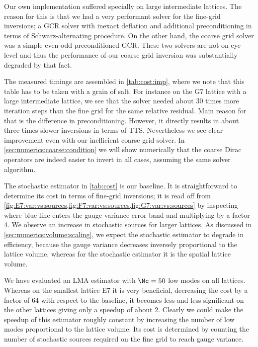 Our own implementation suffered specially on large intermediate lattices.
The reason for this is that we had a very performant solver for the fine-grid inversions; a GCR solver with inexact deflation and additional preconditioning in terms of Schwarz-alternating procedure.
On the other hand, the coarse grid solver was a simple even-odd preconditioned GCR.
These two solvers are not on eye-level and thus the performance of our coarse grid inversion was substantially degraded by that fact.

The measured timings are assembled in \cref{tab:cost:imp}, where we note that this table has to be taken with a grain of salt.
For instance on the G7 lattice with a large intermediate  lattice, we see that the  solver needed about \num{30} times more iteration steps than the fine grid  for the same relative residual.
Main reason for that is the difference in preconditioning.
However, it directly results in about three times slower inversions in terms of TTS.
Nevertheless we see clear improvement even with our inefficient coarse grid solver.
In \cref{sec:numerics:coarse:condition} we will show numerically that the coarse Dirac operators are indeed easier to invert in all cases, assuming the same solver algorithm.

The stochastic estimator in \cref{tab:cost} is our baseline.
It is straightforward to determine its cost in terms of fine-grid inversions; it is read off from \cref{fig:E7:var:vs:sources,fig:F7:var:vs:sources,fig:G7:var:vs:sources} by inspecting where blue line enters the gauge variance error band and multiplying by a factor \num{4}.
We observe an increase in stochastic sources for larger lattices.
As discussed in \cref{sec:numerics:volume:scaling}, we expect the stochastic estimator to degrade in efficiency, because the gauge variance decreases inversely proportional to the lattice volume, whereas for the stochastic estimator it is the spatial lattice volume.

We have evaluated an LMA estimator with $\Nc=50$ low modes on all lattices.
Whereas on the smallest lattice E7 it is very beneficial, decreasing the cost by a factor of \num{64} with respect to the baseline, it becomes less and less significant on the other lattices giving only a speedup of about \num{2}.
Clearly we could make the speedup of this estimator roughly constant by increasing the number of low modes proportional to the lattice volume.
Its cost is determined by counting the number of stochastic sources required on the fine grid to reach gauge variance.

